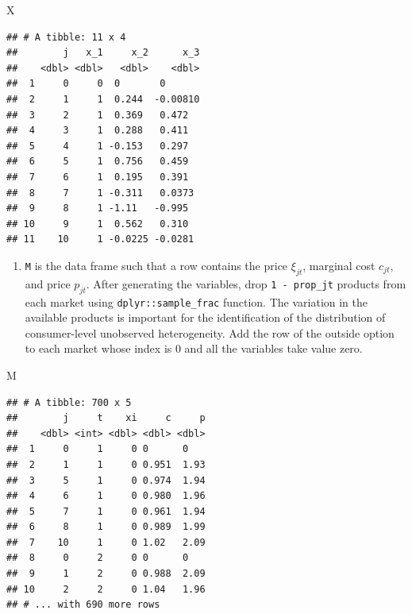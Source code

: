 \documentclass[]{book}
\newenvironment{Shaded}{\begin{snugshade}}{\end{snugshade}}
\newcommand{\NormalTok}[1]{#1}
\providecommand{\tightlist}{%
  \setlength{\itemsep}{0pt}\setlength{\parskip}{0pt}}
\begin{document}
\begin{Shaded}
\begin{Highlighting}[]
\NormalTok{X}
\end{Highlighting}
\end{Shaded}

\begin{verbatim}
## # A tibble: 11 x 4
##        j   x_1     x_2      x_3
##    <dbl> <dbl>   <dbl>    <dbl>
##  1     0     0  0       0      
##  2     1     1  0.244  -0.00810
##  3     2     1  0.369   0.472  
##  4     3     1  0.288   0.411  
##  5     4     1 -0.153   0.297  
##  6     5     1  0.756   0.459  
##  7     6     1  0.195   0.391  
##  8     7     1 -0.311   0.0373 
##  9     8     1 -1.11   -0.995  
## 10     9     1  0.562   0.310  
## 11    10     1 -0.0225 -0.0281
\end{verbatim}

\begin{enumerate}
\def\labelenumi{\arabic{enumi}.}
\setcounter{enumi}{2}
\tightlist
\item
  \texttt{M} is the data frame such that a row contains the price
  \(\xi_{jt}\), marginal cost \(c_{jt}\), and price \(p_{jt}\). After
  generating the variables, drop \texttt{1\ -\ prop\_jt} products from
  each market using \texttt{dplyr::sample\_frac} function. The variation
  in the available products is important for the identification of the
  distribution of consumer-level unobserved heterogeneity. Add the row
  of the outside option to each market whose index is \(0\) and all the
  variables take value zero.
\end{enumerate}

\begin{Shaded}
\begin{Highlighting}[]
\NormalTok{M}
\end{Highlighting}
\end{Shaded}

\begin{verbatim}
## # A tibble: 700 x 5
##        j     t    xi     c     p
##    <dbl> <int> <dbl> <dbl> <dbl>
##  1     0     1     0 0      0   
##  2     1     1     0 0.951  1.93
##  3     5     1     0 0.974  1.94
##  4     6     1     0 0.980  1.96
##  5     7     1     0 0.961  1.94
##  6     8     1     0 0.989  1.99
##  7    10     1     0 1.02   2.09
##  8     0     2     0 0      0   
##  9     1     2     0 0.988  2.09
## 10     2     2     0 1.04   1.96
## # ... with 690 more rows
\end{verbatim}
\end{document}
